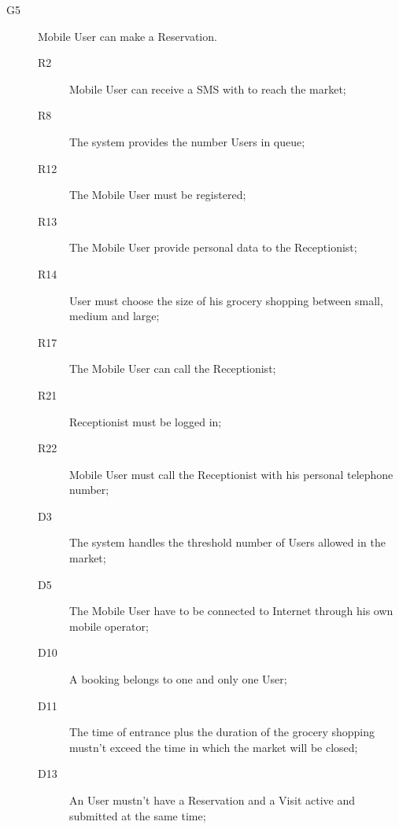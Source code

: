 \begin{description}
    \item[G5]Mobile User can make a Reservation.
    \begin{description}
    \item[R2] Mobile User can receive a SMS with  to reach the market;   %
    \item[R8] The system provides the number Users in queue; %
    \item[R12] The Mobile User must be registered; %
    \item[R13] The Mobile User provide personal data to the Receptionist; %
    \item[R14] User must choose the size of his grocery shopping between small, medium and large;
    \item[R17] The Mobile User can call the Receptionist; 
    \item[R21] Receptionist must be logged in;
    \item[R22] Mobile User must call the Receptionist with his personal telephone number;
    \item[D3] The system handles the threshold number of Users allowed in the market;
    \item[D5] The Mobile User have to be connected to Internet through his own mobile operator;
    \item[D10] A booking belongs to one and only one User;
    \item[D11] The time of entrance plus the duration of the grocery shopping mustn’t exceed the time in which the market will be closed; 
    \item[D13] An User mustn’t have a Reservation and a Visit active and submitted at the same time;     
    \end{description}
    

\end{description}
